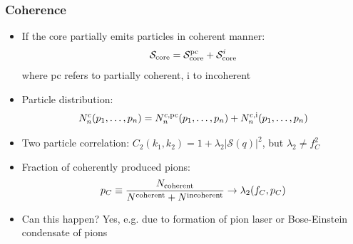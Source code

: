 \documentclass{beamer}
\begin{document}
\begin{frame}
\frametitle{Coherence}
\begin{itemize}
\setlength{\itemsep}{8pt}
\item If the core partially emits particles in coherent manner:
\begin{equation*}
\mathcal{S}_{\rm core}=\mathcal{S}_{\rm core}^{\rm pc}+\mathcal{S}_{\rm core}^{i}
\end{equation*}
where pc refers to partially coherent, i to incoherent
\item Particle distribution:
\begin{equation*}
N_n^{c}(p_1,\dots,p_n) = N_n^{c,{\rm pc}}(p_1,\dots,p_n)+N_n^{c, {\rm i}}(p_1,\dots,p_n)
\end{equation*}
\item Two particle correlation: $C_2(k_1, k_2) =  1+\lambda_2|\mathcal{S}(q)|^2$, but $\lambda_2 \neq f_C^2$
\item Fraction of coherently produced pions:
\begin{equation*}
p_C \equiv \frac{N_{\rm coherent}}{N^{\rm coherent}+N^{\rm incoherent}} \rightarrow \lambda_2(f_C, p_C)
\end{equation*}
\item Can this happen? Yes,  e.g. due to formation of pion laser or Bose-Einstein condensate of pions
\end{itemize}

\end{frame}
\end{document}
